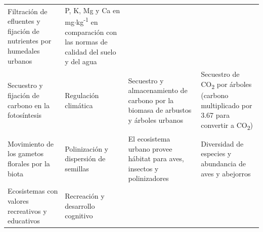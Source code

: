 \documentclass[12pt,a4paper,oneside, openany]{book}
\theoremstyle{definition}
\theoremstyle{definition}
\theoremstyle{definition}
\theoremstyle{remark}
\begin{document}
\begin{longtable}[]{@{}llll@{}}
\begin{minipage}[t]{0.19\columnwidth}
Filtración de efluentes y fijación de nutrientes por humedales
urbanos\strut
\end{minipage} & \begin{minipage}[t]{0.22\columnwidth}\raggedright\strut
P, K, Mg y Ca en mg\(\cdot\)kg\textsuperscript{-1} en comparación con
las normas de calidad del suelo y del agua\strut
\end{minipage}\tabularnewline
\begin{minipage}[t]{0.26\columnwidth}\raggedright\strut
Secuestro y fijación de carbono en la fotosíntesis\strut
\end{minipage} & \begin{minipage}[t]{0.22\columnwidth}\raggedright\strut
Regulación climática\strut
\end{minipage} & \begin{minipage}[t]{0.19\columnwidth}\raggedright\strut
Secuestro y almacenamiento de carbono por la biomasa de arbustos y
árboles urbanos\strut
\end{minipage} & \begin{minipage}[t]{0.22\columnwidth}\raggedright\strut
Secuestro de CO\textsubscript{2} por árboles (carbono multiplicado por
3.67 para convertir a CO\textsubscript{2})\strut
\end{minipage}\tabularnewline
\begin{minipage}[t]{0.26\columnwidth}\raggedright\strut
Movimiento de los gametos florales por la biota\strut
\end{minipage} & \begin{minipage}[t]{0.22\columnwidth}\raggedright\strut
Polinización y dispersión de semillas\strut
\end{minipage} & \begin{minipage}[t]{0.19\columnwidth}\raggedright\strut
El ecosistema urbano provee hábitat para aves, insectos y
polinizadores\strut
\end{minipage} & \begin{minipage}[t]{0.22\columnwidth}\raggedright\strut
Diversidad de especies y abundancia de aves y abejorros\strut
\end{minipage}\tabularnewline
\begin{minipage}[t]{0.26\columnwidth}\raggedright\strut
Ecosistemas con valores recreativos y educativos\strut
\end{minipage} & \begin{minipage}[t]{0.22\columnwidth}\raggedright\strut
Recreación y desarrollo cognitivo\strut
\end{minipage} & \begin{minipage}[t]{0.19\columnwidth}\raggedright\strut

\end{minipage}
\end{longtable}
\end{document}
